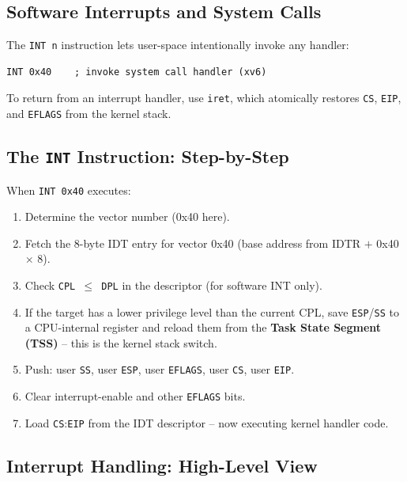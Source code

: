 \documentclass[11pt,a4paper]{article}
\newcommand{\term}[1]{\textbf{#1}}
\newcommand{\code}[1]{\texttt{#1}}
\begin{document}
\subsection{Software Interrupts and System Calls}

The \code{INT n} instruction lets user-space intentionally invoke any handler:

\begin{lstlisting}[language={[x86masm]Assembler},numbers=none]
INT 0x40    ; invoke system call handler (xv6)
\end{lstlisting}

To return from an interrupt handler, use \code{iret}, which atomically
restores \code{CS}, \code{EIP}, and \code{EFLAGS} from the kernel stack.

\subsection{The \texttt{INT} Instruction: Step-by-Step}

When \code{INT 0x40} executes:
\begin{enumerate}
  \item Determine the vector number (0x40 here).
  \item Fetch the 8-byte IDT entry for vector 0x40 (base address from IDTR
        $+$ 0x40 $\times$ 8).
  \item Check \code{CPL $\leq$ DPL} in the descriptor (for software INT only).
  \item If the target has a lower privilege level than the current CPL, save
        \code{ESP}/\code{SS} to a CPU-internal register and reload them from
        the \term{Task State Segment (TSS)} -- this is the kernel stack switch.
  \item Push: user \code{SS}, user \code{ESP}, user \code{EFLAGS}, user
        \code{CS}, user \code{EIP}.
  \item Clear interrupt-enable and other \code{EFLAGS} bits.
  \item Load \code{CS}:\code{EIP} from the IDT descriptor -- now executing
        kernel handler code.
\end{enumerate}

\subsection{Interrupt Handling: High-Level View}
\end{document}
